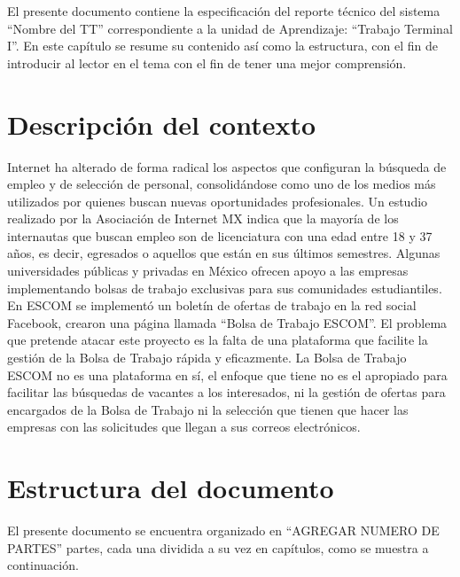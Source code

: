 \selectfont
	El presente documento contiene la especificación del reporte técnico del sistema ``Nombre del TT” correspondiente a la unidad de Aprendizaje: “Trabajo Terminal I''.
	En este capítulo se resume su contenido así como la estructura, con el fin de introducir al lector en el tema con el fin de 
	tener una mejor comprensión.

	\section{Descripción del contexto}
	Internet ha alterado de forma radical los aspectos que configuran la búsqueda de empleo y de selección de personal, 
	consolidándose como uno de los medios más utilizados por quienes buscan nuevas oportunidades profesionales. Un estudio 
	realizado por la Asociación de Internet MX indica que la mayoría de los internautas que buscan empleo son de licenciatura con 
	una edad entre 18 y 37 años, es decir, egresados o aquellos que están en sus últimos semestres. Algunas universidades 
	públicas y privadas en México ofrecen apoyo a las empresas implementando bolsas de trabajo exclusivas para sus comunidades 
	estudiantiles. En ESCOM se implementó un boletín de ofertas de trabajo en la red social Facebook, crearon una página llamada 
	``Bolsa de Trabajo ESCOM''. \newline
	El problema que pretende atacar este proyecto es la falta de una plataforma que facilite la gestión de la Bolsa de Trabajo 
	rápida y eficazmente. La Bolsa de Trabajo ESCOM no es una plataforma en sí, el enfoque que tiene no es el apropiado para 
	facilitar las búsquedas de vacantes a los interesados, ni la gestión de ofertas para encargados de la Bolsa de Trabajo ni 
	la selección que tienen que hacer las empresas con las solicitudes que llegan a sus correos electrónicos.



    \section{Estructura del documento}

       
	El presente documento se encuentra organizado en ``AGREGAR NUMERO DE PARTES'' partes, cada una dividida a su vez en capítulos, 
	como se muestra a continuación. \\


